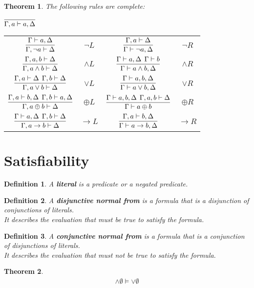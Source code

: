 \documentclass{article}
\theoremstyle{sltheorem}
\newtheorem{definition}{Definition}
\newtheorem{theorem}{Theorem}
\begin{document}
\begin{theorem}
	The following rules are complete:
	\begin{center}
		$\infer{\Gamma, a \vdash a, \Delta}{}$\\
		{\renewcommand{\arraystretch}{3}
		\begin{tabular}{c c c c}
			$\vcenter{\infer{\Gamma,\neg a\vdash \Delta}{\Gamma\vdash a, \Delta}}$
			 & $\neg L$
			 & $\vcenter{\infer{\Gamma\vdash \neg a, \Delta}{\Gamma, a\vdash \Delta}}$
			 & $\neg R$                                                                                       \\
			$\vcenter{\infer{\Gamma, a\wedge b\vdash \Delta}{\Gamma, a, b\vdash \Delta}}$
			 & $\wedge L$
			 & $\vcenter{\infer{\Gamma\vdash a\wedge b, \Delta}{\Gamma\vdash a, \Delta\:\: \Gamma\vdash b}}$
			 & $\wedge R$                                                                                     \\
			$\vcenter{\infer{\Gamma, a\vee b\vdash \Delta}{\Gamma,a\vdash \Delta\:\:\Gamma,b\vdash\Delta}}$
			 & $\vee L$
			 & $\vcenter{\infer{\Gamma\vdash a\vee b,\Delta}{\Gamma\vdash a,b,\Delta}}$
			 & $\vee R$                                                                                       \\
			$\vcenter{\infer{\Gamma, a\oplus b\vdash\Delta}{\Gamma, a\vdash b, \Delta\:\:\Gamma, b\vdash a,\Delta}}$
			 & $\oplus L$
			 & $\vcenter{\infer{\Gamma\vdash a\oplus b}{\Gamma\vdash a,b,\Delta\:\:\Gamma,a,b\vdash \Delta}}$
			 & $\oplus R$                                                                                     \\
			$\vcenter{\infer{\Gamma, a\to b\vdash \Delta}{\Gamma\vdash a,\Delta\:\:\Gamma, b\vdash \Delta}}$
			 & $\to L$
			 & $\vcenter{\infer{\Gamma\vdash a\to b, \Delta}{\Gamma,a\vdash b,\Delta}}$
			 & $\to R$
		\end{tabular}
		}
	\end{center}
\end{theorem}
\section{Satisfiability}
\begin{definition}
	A \textbf{literal} is a predicate or a negated predicate.
\end{definition}
\begin{definition}
	A \textbf{disjunctive normal from} is a formula that is a disjunction of conjunctions of literals.\\
	It describes the evaluation that must be true to satisfy the formula.
\end{definition}
\begin{definition}
	A \textbf{conjunctive normal from} is a formula that is a conjunction of disjunctions of literals.\\
	It describes the evaluation that must not be true to satisfy the formula.
\end{definition}
\begin{theorem}
	\begin{gather*}
		\wedge \emptyset\vDash\vee\emptyset
	\end{gather*}
\end{theorem}
\end{document}

